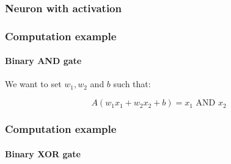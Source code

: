 \documentclass[9pt]{beamer}
\begin{document}
\begin{frame}
  \frametitle{Neuron with activation}

  \begin{center}
    \scalebox{0.6}{
      
    }
  \end{center}


\end{frame}

\begin{frame}
  \frametitle{Computation example}

  \framesubtitle{Binary AND gate}

  \begin{center}
    \scalebox{1}{
      
    }
  \end{center}

  We want to set $w_{1}, w_{2}$ and $b$ such that:
  
  \[
  A(w_{1}x_{1} + w_{2}x_{2} + b) = x_{1} \text{ AND } x_{2}
  \]


\end{frame}

\begin{frame}
  \frametitle{Computation example}

  \framesubtitle{Binary XOR gate}

  \begin{center}
    \scalebox{0.7}{
      
    }
  \end{center}
\end{frame}
\end{document}
